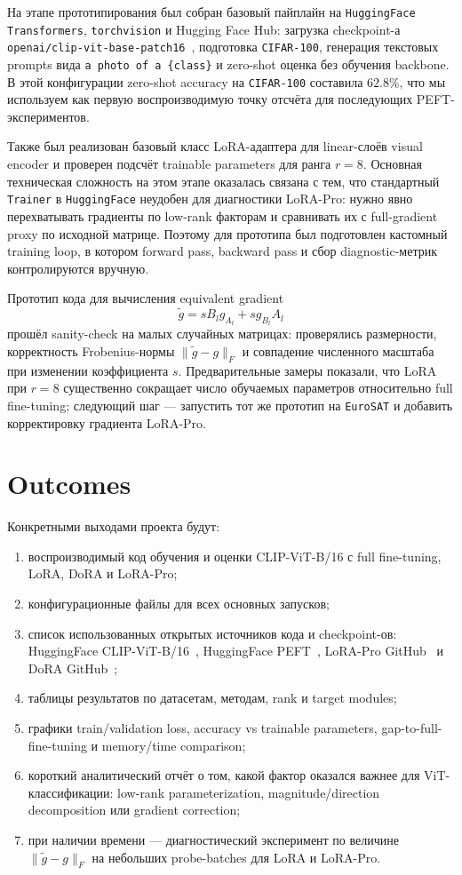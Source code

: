 \documentclass[]{scrartcl}
\begin{document}
На этапе прототипирования был собран базовый пайплайн на \texttt{HuggingFace Transformers}, \texttt{torchvision} и Hugging Face Hub: загрузка checkpoint-а \texttt{openai/clip-vit-base-patch16}~\cite{huggingfaceclipvit}, подготовка \texttt{CIFAR-100}, генерация текстовых prompts вида \texttt{a photo of a \{class\}} и zero-shot оценка без обучения backbone. В этой конфигурации zero-shot accuracy на \texttt{CIFAR-100} составила $62.8\%$, что мы используем как первую воспроизводимую точку отсчёта для последующих PEFT-экспериментов.

Также был реализован базовый класс LoRA-адаптера для linear-слоёв visual encoder и проверен подсчёт trainable parameters для ранга $r=8$. Основная техническая сложность на этом этапе оказалась связана с тем, что стандартный \texttt{Trainer} в \texttt{HuggingFace} неудобен для диагностики LoRA-Pro: нужно явно перехватывать градиенты по low-rank факторам и сравнивать их с full-gradient proxy по исходной матрице. Поэтому для прототипа был подготовлен кастомный training loop, в котором forward pass, backward pass и сбор diagnostic-метрик контролируются вручную.

Прототип кода для вычисления equivalent gradient
\[
    \widetilde{g}=sB_lg_{A_l}+sg_{B_l}A_l
\]
прошёл sanity-check на малых случайных матрицах: проверялись размерности, корректность Frobenius-нормы $\|\widetilde{g}-g\|_F$ и совпадение численного масштаба при изменении коэффициента $s$. Предварительные замеры показали, что LoRA при $r=8$ существенно сокращает число обучаемых параметров относительно full fine-tuning; следующий шаг --- запустить тот же прототип на \texttt{EuroSAT} и добавить корректировку градиента LoRA-Pro.

\section{Outcomes}

Конкретными выходами проекта будут:
\begin{enumerate}
    \item воспроизводимый код обучения и оценки CLIP-ViT-B/16 с full fine-tuning, LoRA, DoRA и LoRA-Pro;
    \item конфигурационные файлы для всех основных запусков;
    \item список использованных открытых источников кода и checkpoint-ов: HuggingFace CLIP-ViT-B/16~\cite{huggingfaceclipvit}, HuggingFace PEFT~\cite{huggingfacepeftlora}, LoRA-Pro GitHub~\cite{loraprogithub} и DoRA GitHub~\cite{doragithub};
    \item таблицы результатов по датасетам, методам, rank и target modules;
    \item графики train/validation loss, accuracy vs trainable parameters, gap-to-full-fine-tuning и memory/time comparison;
    \item короткий аналитический отчёт о том, какой фактор оказался важнее для ViT-классификации: low-rank parameterization, magnitude/direction decomposition или gradient correction;
    \item при наличии времени --- диагностический эксперимент по величине $\|\widetilde{g}-g\|_F$ на небольших probe-batches для LoRA и LoRA-Pro.
\end{enumerate}
\end{document}
